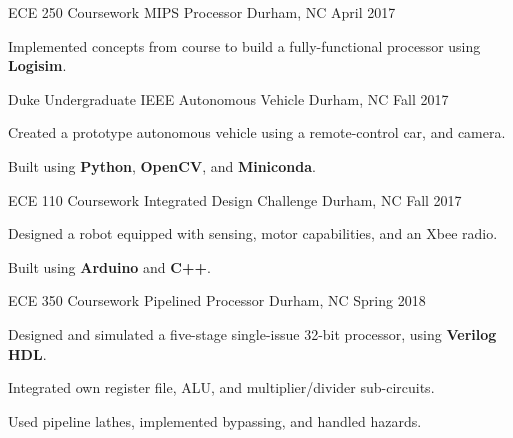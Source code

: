 \begin{cventries}
  \cventry
    {ECE 250 Coursework} %
    {MIPS Processor}
    {Durham, NC} %
    {April 2017} %
    {
      \begin{cvitems} %
        \item {Implemented concepts from course to build a fully-functional processor using \textbf{Logisim}.}
      \end{cvitems}
    }
  \cventry
    {Duke Undergraduate IEEE} %
    {Autonomous Vehicle}
    {Durham, NC} %
    {Fall 2017} %
    {
      \begin{cvitems} %
        \item {Created a prototype autonomous vehicle using a remote-control car, and camera.}
        \item {Built using \textbf{Python}, \textbf{OpenCV}, and \textbf{Miniconda}.}
      \end{cvitems}
    }
  \cventry
    {ECE 110 Coursework}
    {Integrated Design Challenge}
    {Durham, NC}
    {Fall 2017}
    {
      \begin{cvitems}
        \item {Designed a robot equipped with sensing, motor capabilities, and an Xbee radio.}
        \item {Built using \textbf{Arduino} and \textbf{C++}.}
      \end{cvitems}
    }
  \cventry
    {ECE 350 Coursework}
    {Pipelined Processor}
    {Durham, NC}
    {Spring 2018}
    {
       \begin{cvitems}
         \item {Designed and simulated a five-stage single-issue 32-bit processor, using \textbf{Verilog HDL}.}
         \item {Integrated own register file, ALU, and multiplier/divider sub-circuits.}
         \item {Used pipeline lathes, implemented bypassing, and handled hazards.}
       \end{cvitems}
   }
\end{cventries}
